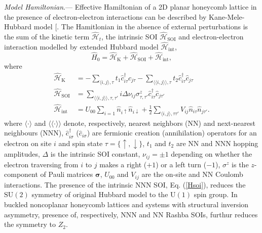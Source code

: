 \documentclass[aps,prl,twocolumn,amsmath,amssymb,nobibnotes]{revtex4-1}%
\renewcommand{\cite}[1]{{[}\onlinecite{#1}{]}}
\begin{document}
\textit{Model Hamiltonian}.---
Effective Hamiltonian of a 2D planar honeycomb lattice in the presence of electron-electron interactions can be described by Kane-Mele-Hubbard model \cite{Kane2005,Griset2012,Auerbach}. 
The Hamitlonian in the absence of external perturbations is the sum of the kinetic term $\hat{\mathcal{H}}_t$, the intrinsic SOI $\hat{\mathcal{H}}_{\text{SOI}}$ and electron-electron interaction modelled by extended Hubbard model $\hat{\mathcal{H}}_{\text{int}}$,
\begin{equation}
\label{MKMH}
\hat{H}_0 = \hat{\mathcal{H}}_{\text{K}} + \hat{\mathcal{H}}_{\text{SOI}} + \hat{\mathcal{H}}_{\text{int}},
\end{equation}
where
\begin{align}
\hat{\mathcal{H}}_{\text{K}} &= - \sum_{\langle i,j \rangle, \tau} t_{1}\hat{c}_{i \tau}^\dagger \hat{c}_{j \tau} - \sum_{\langle \langle i,j \rangle \rangle, \tau} t_{2}\hat{c}_{i \tau}^\dagger \hat{c}_{j \tau} \label{Ht} \\
\hat{\mathcal{H}}_{\text{SOI}} & = \sum_{\langle \langle i,j \rangle \rangle, \tau,\tau'} i\Delta\nu_{ij}\sigma^z_{\tau, \tau'}\hat{c}_{i \tau}^\dagger \hat{c}_{j \tau'} \label{Hsoi} \\
\hat{\mathcal{H}}_{\text{int}} &= U_{00}\sum_{i=1} \hat{n}_{i\uparrow}\hat{n}_{i\downarrow} + \frac{1}{2}\sum_{\langle i,j \rangle, \tau \tau'} V_{ij}\hat{n}_{i\tau}\hat{n}_{j\tau'} \label{Hint}.
\end{align}
where $\langle\cdot\rangle$ and $\langle\langle\cdot\rangle\rangle$ denote, respectively, nearest neighbors (NN) and next-nearest neighbours (NNN), $\hat{c}_{i \sigma}^\dagger$ ($ \hat{c}_{i \sigma}$) are fermionic creation (annihilation) operators for an electron on site $i$ and spin state $\tau=\{\uparrow,\downarrow\}$, $t_1$ and $t_2$ are NN and NNN hopping amplitudes, $\Delta$ is the intrinsic SOI constant, $\nu_{ij}=\pm 1$ depending on whether the electron traversing from $i$ to $j$ makes a right ($+1$) or a left turn ($-1$), $\sigma^{z}$ is the $z$-component of Pauli matrices $\bm{\sigma}$, $U_{00}$ and $V_{ij}$ are the on-site and NN Coulomb interactions.
The presence of the intrinsic NNN SOI, Eq. (\ref{Hsoi}), reduces the $\mathrm{SU}(2)$ symmetry of original Hubbard model to the $\mathrm{U}(1)$ spin group. In buckled noncoplanar honeycomb lattices and systems with structural inversion asymmetry, presence of, respectively, NNN and NN Rashba SOIs, furthur reduces the symmetry to $Z_2$.
\end{document}
